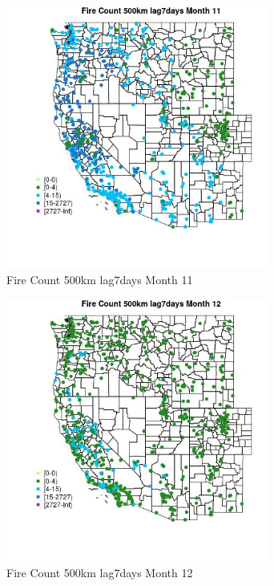 \begin{figure} 
\centering  
\includegraphics[width=0.77\textwidth]{Code_Outputs/Report_ML_input_PM25_Step4_part_f_de_duplicated_aves_prioritize_24hr_obswNAs_MapObsMo11Fire_Count_500km_lag7days.jpg} 
\caption{\label{fig:Report_ML_input_PM25_Step4_part_f_de_duplicated_aves_prioritize_24hr_obswNAsMapObsMo11Fire_Count_500km_lag7days}Fire Count 500km lag7days Month 11} 
\end{figure} 
 

\begin{figure} 
\centering  
\includegraphics[width=0.77\textwidth]{Code_Outputs/Report_ML_input_PM25_Step4_part_f_de_duplicated_aves_prioritize_24hr_obswNAs_MapObsMo12Fire_Count_500km_lag7days.jpg} 
\caption{\label{fig:Report_ML_input_PM25_Step4_part_f_de_duplicated_aves_prioritize_24hr_obswNAsMapObsMo12Fire_Count_500km_lag7days}Fire Count 500km lag7days Month 12} 
\end{figure} 
 

